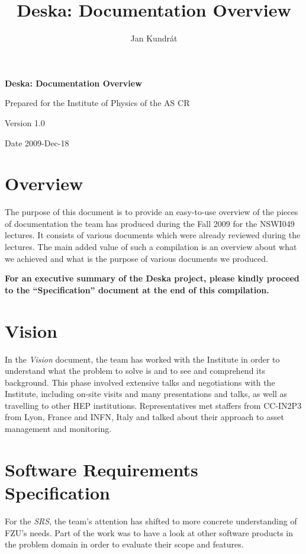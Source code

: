 \documentclass[12pt]{article}
\author{Jan Kundrát}
\title{Deska: Documentation Overview}
\begin{document}
{\Huge \textbf{Deska: Documentation Overview}}

\vspace{0.2in}

{\large Prepared for the Institute of Physics of the AS CR}

\vspace{0.2in}

{\large Version 1.0}

\vspace{0.2in}

{\large Date 2009-Dec-18}

\section{Overview}

The purpose of this document is to provide an easy-to-use overview of the pieces of documentation the team has produced during the
Fall 2009 for the NSWI049 lectures.  It consists of various documents which were already reviewed during the lectures.  The main
added value of such a compilation is an overview about what we achieved and what is the purpose of various documents we produced.

{\bf For an executive summary of the Deska project, please kindly proceed to the ``Specification'' document at the end of this
compilation.}

\section{Vision}

In the {\em Vision} document, the team has worked with the Institute in order to understand what the problem to solve is and to
see and comprehend its background.  This phase involved extensive talks and negotiations with the Institute, including on-site
visits and many presentations and talks, as well as travelling to other HEP institutions.  Representatives met staffers from
CC-IN2P3 from Lyon, France and INFN, Italy and talked about their approach to asset management and monitoring.

\section{Software Requirements Specification}

For the {\em SRS}, the team's attention has shifted to more concrete understanding of FZU's needs.  Part of the work was to have a
look at other software products in the problem domain in order to evaluate their scope and features.
\end{document}
